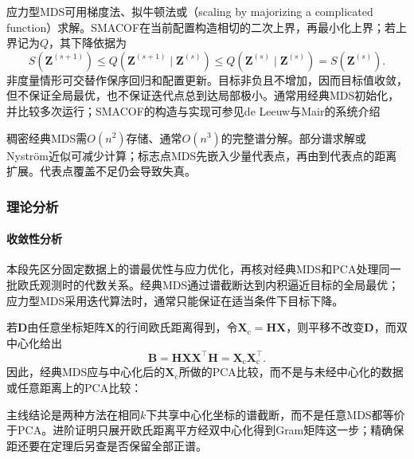 应力型MDS可用梯度法、拟牛顿法或（scaling by majorizing a complicated function）求解。SMACOF在当前配置构造相切的二次上界，再最小化上界；若上界记为$Q$，其下降依据为
\[
  S(\bm{Z}^{(s+1)})
  \leq Q(\bm{Z}^{(s+1)}\mid\bm{Z}^{(s)})
  \leq Q(\bm{Z}^{(s)}\mid\bm{Z}^{(s)})
  =S(\bm{Z}^{(s)}).
\]
非度量情形可交替作保序回归和配置更新。目标非负且不增加，因而目标值收敛，但不保证全局最优，也不保证迭代点总到达局部极小。通常用经典MDS初始化，并比较多次运行；SMACOF的构造与实现可参见de Leeuw与Mair的系统介绍

稠密经典MDS需$O(n^2)$存储、通常$O(n^3)$的完整谱分解。部分谱求解或Nystr\"om近似可减少计算；标志点MDS先嵌入少量代表点，再由到代表点的距离扩展。代表点覆盖不足仍会导致失真。

\subsubsection{理论分析}
\label{sec:dim-mds-theory}

\paragraph{收敛性分析}

本段先区分固定数据上的谱最优性与应力优化，再核对经典MDS和PCA处理同一批欧氏观测时的代数关系。经典MDS通过谱截断达到内积逼近目标的全局最优；应力型MDS采用迭代算法时，通常只能保证在适当条件下目标下降。

若$\bm{D}$由任意坐标矩阵$\bm{X}$的行间欧氏距离得到，令$\bm{X}_{\mathrm{c}}=\bm{H}\bm{X}$，则平移不改变$\bm{D}$，而双中心化给出
\[
  \bm{B}=\bm{H}\bm{X}\bm{X}^{\top}\bm{H}
  =\bm{X}_{\mathrm{c}}\bm{X}_{\mathrm{c}}^{\top}.
\]
因此，经典MDS应与中心化后的$\bm{X}_{\mathrm{c}}$所做的PCA比较，而不是与未经中心化的数据或任意距离上的PCA比较：

主线结论是两种方法在相同$k$下共享中心化坐标的谱截断，而不是任意MDS都等价于PCA。进阶证明只展开欧氏距离平方经双中心化得到Gram矩阵这一步；精确保距还要在定理后另查是否保留全部正谱。

